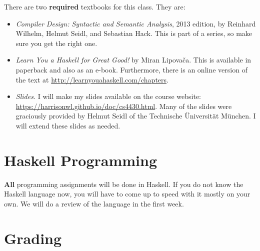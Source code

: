 \documentclass[11pt]{article}
\begin{document}
There are two {\bf{required}} textbooks for this class. They are:
\begin{itemize}
\item {\it Compiler Design: Syntactic and Semantic Analysis}, 2013 edition, by Reinhard Wilhelm, Helmut Seidl, and Sebastian Hack. This is part of a series, so make sure you get the right one.

\item {\it Learn You a Haskell for Great Good!} by Miran Lipova\v{c}a. This is available in  paperback and also as an e-book. Furthermore,  there is an online version of the text at \url{http://learnyouahaskell.com/chapters}. 

\item {\it Slides.} I will make my slides available on the course website: \url{https://harrisonwl.github.io/doc/cs4430.html}. Many of the slides were graciously provided by Helmut Seidl of the Technische \"{U}niversit\"{a}t M\"{u}nchen. I will extend these slides as needed.
\end{itemize}

\section{Haskell Programming}

{\bf All} programming assignments will be done in Haskell. If you do not know the Haskell language now, you will have to come up to speed with it mostly on your own. We will do a review of the language in the first week.


%



\section{Grading}
\end{document}
